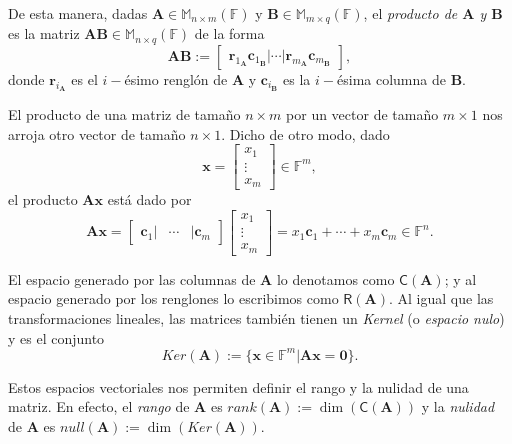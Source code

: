             
            De esta manera, dadas $\mathbf{A} \in \mathbb{M}_{n \times m}(\mathbb{F})$ y $\mathbf{B} \in \mathbb{M}_{m \times q}(\mathbb{F})$, el \textit{producto de $\mathbf{A}$ y $\mathbf{B}$} es la matriz $\mathbf{AB} \in \mathbb{M}_{n \times q}(\mathbb{F})$ de la forma $$ \mathbf{AB}:= \begin{bmatrix}
            \mathbf{r}_{1_{\mathbf{A}}}\mathbf{c}_{1_\mathbf{B}} | \cdots | \mathbf{r}_{m_{\mathbf{A}}}\mathbf{c}_{m_{\mathbf{B}}}
            \end{bmatrix}, $$ donde $\mathbf{r}_{i_\mathbf{A}}$ es el $i-$ésimo renglón de $\mathbf{A}$ y $\mathbf{c}_{i_\mathbf{B}}$ es la $i-$ésima columna de $\mathbf{B}$.
            
            
            El producto de una matriz de tamaño $n \times m$ por un vector de tamaño $m \times 1$ nos arroja otro vector de tamaño $n \times 1$. Dicho de otro modo, dado  $$\mathbf{x} = \begin{bmatrix}
            x_{1} \\
            \vdots \\
            x_{m}
            \end{bmatrix} \in \mathbb{F}^{m},$$ el producto $\mathbf{Ax}$ está dado por $$ \mathbf{Ax} =  \begin{bmatrix}
            \mathbf{c}_{1} | & \cdots & |\mathbf{c}_{m}
            \end{bmatrix} \begin{bmatrix}
            x_{1} \\
            \vdots\\
            x_{m}
            \end{bmatrix} = x_{1}\mathbf{c}_{1} + \cdots + x_{m}\mathbf{c}_{m} \in \mathbb{F}^{n}.
            $$
            
            El espacio generado por las columnas de $\mathbf{A}$  lo denotamos como $\mathsf{C}(\mathbf{A})$; y al espacio generado por los renglones  lo escribimos como $\mathsf{R}(\mathbf{A})$. Al igual que las transformaciones lineales, las matrices también tienen un \textit{Kernel} (o \textit{espacio nulo}) y es el conjunto $$Ker(\mathbf{A}) := \{\mathbf{x} \in \mathbb{F}^{m} | \mathbf{Ax} = \mathbf{0}\}.
            $$
            
            Estos espacios vectoriales nos permiten definir el rango y la nulidad de una matriz. En efecto, el \textit{rango}  de $\mathbf{A}$ es $rank(\mathbf{A}):= \dim(\mathsf{C}(\mathbf{A}))$ y la \textit{nulidad}  de $\mathbf{A}$ es $null(\mathbf{A}):= \dim(Ker(\mathbf{A}))$.
            
